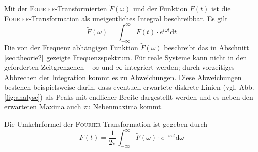 Mit der \textsc{Fourier}-Transformierten $\tilde{F}(\omega)$ und der Funktion $F(t)$ ist die \textsc{Fourier}-Transformation als uneigentliches Integral beschreibbar.
Es gilt
\begin{equation}
	\tilde{F}(\omega)=\int_{-\infty}^{\infty}F(t)\cdot e^{i\omega t} \mathup{d}t
	\label{eq:fourier}
\end{equation}
Die von der Frequenz abhängigen Funktion $\tilde F(\omega)$ beschreibt das in Abschnitt \ref{sec:theorie2} gezeigte Frequenzspektrum. 
Für reale Systeme kann nicht in den geforderten Zeitgrenzenen $-\infty$ und $\infty$ integriert werden; 
durch vorzeitiges Abbrechen der Integration kommt es zu Abweichungen.
Diese Abweichungen bestehen beispielsweise darin, dass eventuell erwartete diskrete Linien (vgl. Abb. \ref{fig:analyse}) als Peaks mit endlicher Breite dargestellt werden und es neben den erwarteten Maxima auch zu Nebenmaxima kommt.

Die Umkehrformel der \textsc{Fourier}-Transformation ist gegeben durch
\begin{equation}
	F(t)=\frac{1}{2\pi}\int_{-\infty}^{\infty}\tilde{F}(\omega)\cdot e^{-i\omega t} \mathup{d}\omega
	\label{eq:reiruof}
\end{equation}
